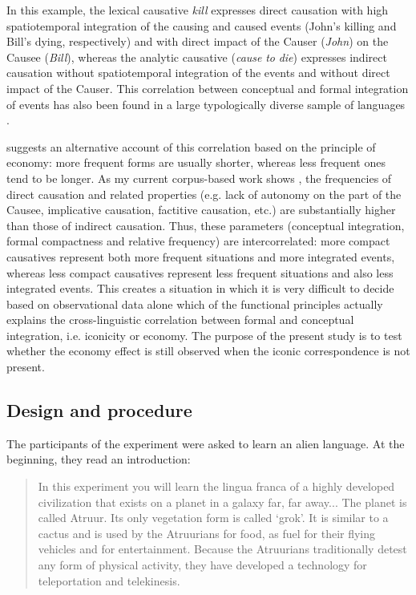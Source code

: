 \documentclass[output=paper]{langsci/langscibook}
\begin{document}
In this example, the lexical causative \textit{kill} expresses direct causation with high spatiotemporal integration of the causing and caused events (John’s killing and Bill’s dying, respectively) and with direct impact of the Causer (\textit{John}) on the Causee (\textit{Bill}), whereas the analytic causative (\textit{cause} \textit{to} \textit{die}) expresses indirect causation without spatiotemporal integration of the events and without direct impact of the Causer. This correlation between conceptual and formal integration of events has also been found in a large typologically diverse sample of languages \citep{Levshina2017}.

\citet{Haspelmath2008_FreqIcon} suggests an alternative account of this correlation based on the principle of economy: more frequent forms are usually shorter, whereas less frequent ones tend to be longer. As my current corpus-based work shows \citep{Levshina2016}, the frequencies of direct causation and related properties (e.g. lack of autonomy on the part of the Causee, implicative causation, factitive causation, etc.) are substantially higher than those of indirect causation. Thus, these parameters (conceptual integration, formal compactness and relative frequency) are intercorrelated: more compact causatives represent both more frequent situations and more integrated events, whereas less compact causatives represent less frequent situations and also less integrated events. This creates a situation in which it is very difficult to decide based on observational data alone which of the functional principles actually explains the cross-linguistic correlation between formal and conceptual integration, i.e. iconicity or economy. The purpose of the present study is to test whether the economy effect is still observed when the iconic correspondence is not present. 

\subsection{Design and procedure}

The participants of the experiment were asked to learn an alien language. At the beginning, they read an introduction:

\begin{quote}
In this experiment you will learn the lingua franca of a highly developed civilization that exists on a planet in a galaxy far, far away...  The planet is called Atruur. Its only vegetation form is called ‘grok’. It is similar to a cactus and is used by the Atruurians for food, as fuel for their flying vehicles and for entertainment. Because the Atruurians traditionally detest any form of physical activity, they have developed a technology for teleportation and telekinesis.
\end{quote}
\end{document}
